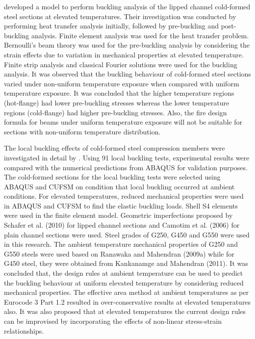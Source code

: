 \citet{Cheng2015} developed a model to perform buckling analysis of the lipped channel cold-formed steel sections at elevated temperatures. Their investigation was conducted by performing heat transfer analysis initially, followed by pre-buckling and post-buckling analysis. Finite element analysis was used for the heat transfer problem. Bernoulli’s beam theory was used for the pre-buckling analysis by considering the strain effects due to variation in mechanical properties at elevated temperature. Finite strip analysis and classical Fourier solutions were used for the buckling analysis. It was observed that the buckling behaviour of cold-formed steel sections varied under non-uniform temperature exposure when compared with uniform temperature exposure. It was concluded that the higher temperature regions (hot-flange) had lower pre-buckling stresses whereas the lower temperature regions (cold-flange) had higher pre-buckling stresses. Also, the fire design formula for beams under uniform temperature exposure will not be suitable for sections with non-uniform temperature distribution.

The local buckling effects of cold-formed steel compression members were investigated in detail by \citet{Gunalan2015}. Using 91 local buckling tests, experimental results were compared with the numerical predictions from ABAQUS for validation purposes. The cold-formed sections for the local buckling tests were selected using ABAQUS and CUFSM on condition that local buckling occurred at ambient conditions. For elevated temperatures, reduced mechanical properties were used in ABAQUS and CUFSM to find the elastic buckling loads. Shell S4 elements were used in the finite element model. Geometric imperfections proposed by Schafer et al. (2010) for lipped channel sections and Camotim et al. (2006) for plain channel sections were used. Steel grades of G250, G450 and G550 were used in this research. The ambient temperature mechanical properties of G250 and G550 steels were used based on Ranawaka and Mahendran (2009a) while for G450 steel, they were obtained from Kankanamge and Mahendran (2011). It was concluded that, the design rules at ambient temperature can be used to predict the buckling behaviour at uniform elevated temperature by considering reduced mechanical properties. The effective area method at ambient temperatures as per Eurocode 3 Part 1.2 resulted in over-conservative results at elevated temperatures also. It was also proposed that at elevated temperatures the current design rules can be improvised by incorporating the effects of non-linear stress-strain relationships.

